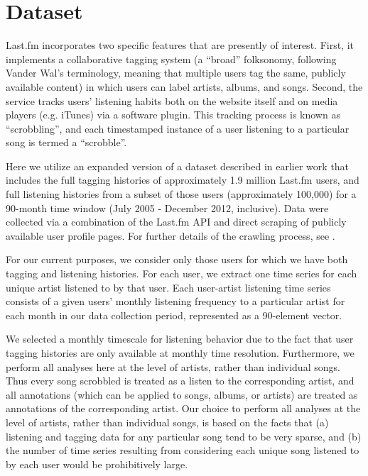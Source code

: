 \section{Dataset}
\label{sec_dataset}
Last.fm incorporates two specific features that are presently of interest. First, it implements a collaborative tagging system (a ``broad'' folksonomy, following Vander Wal's \cite{VanderWal2005} terminology, meaning that multiple users tag the same, publicly available content) in which users can label artists, albums, and songs. Second, the service tracks users' listening habits both on the website itself and on media players (e.g. iTunes) via a software plugin. This tracking process is known as ``scrobbling'', and each timestamped instance of a user listening to a particular song is termed a ``scrobble''.

Here we utilize an expanded version of a dataset described in earlier work \cite{Lorince2013,Lorince2014} that includes the full tagging histories of approximately 1.9 million Last.fm users, and full listening histories from a subset of those users (approximately 100,000) for a 90-month time window (July 2005 - December 2012, inclusive). Data were collected via a combination of the Last.fm API and direct scraping of publicly available user profile pages. For further details of the crawling process, see \cite{Lorince2013,Lorince2014}. 

For our current purposes, we consider only those users for which we have both tagging and listening histories. For each user, we extract one time series for each unique artist listened to by that user. Each user-artist listening time series consists of a given users' monthly listening frequency to a particular artist for each month in our data collection period, represented as a 90-element vector.

We selected a monthly timescale for listening behavior due to the fact that user tagging histories are only available at monthly time resolution. Furthermore, we perform all analyses here at the level of artists, rather than individual songs. Thus every song scrobbled is treated as a listen to the corresponding artist, and all annotations (which can be applied to songs, albums, or artists) are treated as annotations of the corresponding artist. Our choice to perform all analyses at the level of artists, rather than individual songs, is based on the facts that (a) listening and tagging data for any particular song tend to be very sparse, and (b) the number of time series resulting from considering each unique song listened to by each user would be prohibitively large.

